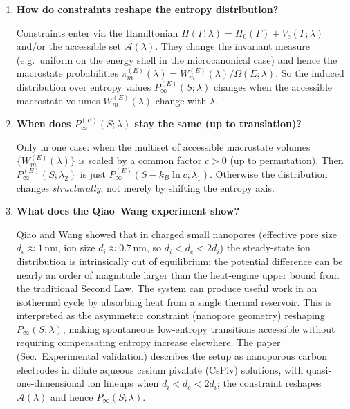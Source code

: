\documentclass[11pt,a4paper]{article}
\begin{document}
\begin{enumerate}[leftmargin=*]
$P_{\infty}(S;\lambda)$ is the \emph{long-time} entropy distribution induced by the invariant measure: the probability distribution of (coarse-grained) entropy $S$ in the limit of long times, under constraint parameters $\lambda$ (geometry, boundary conditions, static fields, etc.). It is made precise either by ergodic/mixing dynamics or by an initial ensemble drawn from the invariant measure (microcanonical or canonical). The paper proves from first principles that changing $\lambda$ (Hamiltonian and/or accessible phase space) changes this distribution.

\item \textbf{How do constraints reshape the entropy distribution?}

Constraints enter via the Hamiltonian $H(\Gamma;\lambda) = H_0(\Gamma) + V_{\mathrm{c}}(\Gamma;\lambda)$ and/or the accessible set $\mathcal{A}(\lambda)$. They change the invariant measure (e.g.\ uniform on the energy shell in the microcanonical case) and hence the macrostate probabilities $\pi_m^{(E)}(\lambda) = W_m^{(E)}(\lambda)/\Omega(E;\lambda)$. So the induced distribution over entropy values $P_{\infty}^{(E)}(S;\lambda)$ changes when the accessible macrostate volumes $W_m^{(E)}(\lambda)$ change with $\lambda$.

\item \textbf{When does $P_{\infty}^{(E)}(S;\lambda)$ stay the same (up to translation)?}

Only in one case: when the multiset of accessible macrostate volumes $\{W_m^{(E)}(\lambda)\}$ is scaled by a common factor $c > 0$ (up to permutation). Then $P_{\infty}^{(E)}(S;\lambda_2)$ is just $P_{\infty}^{(E)}(S - k_B\ln c;\lambda_1)$. Otherwise the distribution changes \emph{structurally}, not merely by shifting the entropy axis.

\item \textbf{What does the Qiao--Wang experiment show?}

Qiao and Wang showed that in charged small nanopores (effective pore size $d_e \approx 1\,\mathrm{nm}$, ion size $d_i \approx 0.7\,\mathrm{nm}$, so $d_i < d_e < 2d_i$) the steady-state ion distribution is intrinsically out of equilibrium: the potential difference can be nearly an order of magnitude larger than the heat-engine upper bound from the traditional Second Law. The system can produce useful work in an isothermal cycle by absorbing heat from a single thermal reservoir. This is interpreted as the asymmetric constraint (nanopore geometry) reshaping $P_{\infty}(S;\lambda)$, making spontaneous low-entropy transitions accessible without requiring compensating entropy increase elsewhere. The paper (Sec.~Experimental validation) describes the setup as nanoporous carbon electrodes in dilute aqueous cesium pivalate (CsPiv) solutions, with quasi-one-dimensional ion lineups when $d_i < d_e < 2d_i$; the constraint reshapes $\mathcal{A}(\lambda)$ and hence $P_{\infty}(S;\lambda)$.


\end{enumerate}
\end{document}
